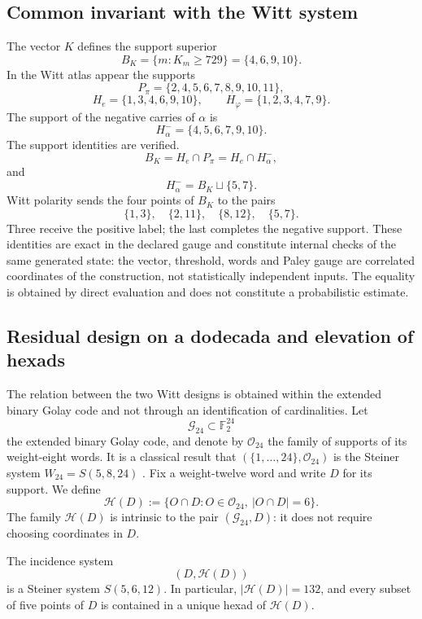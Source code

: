 \subsection{Common invariant with the Witt system}

The vector \(K\) defines the support superior
\[
B_K=\{m:K_m\ge729\}=\{4,6,9,10\}.
\]
In the Witt atlas appear the supports
\[
P_\pi=\{2,4,5,6,7,8,9,10,11\},
\]
\[
H_e=\{1,3,4,6,9,10\},
\qquad
H_\varphi=\{1,2,3,4,7,9\}.
\]
The support of the negative carries of \(\alpha\) is
\[
H_\alpha^-=\{4,5,6,7,9,10\}.
\]
The support identities are verified.
\[
\boxed{
B_K=H_e\cap P_\pi=H_e\cap H_\alpha^-,}
\]
and
\[
\boxed{H_\alpha^-=B_K\sqcup\{5,7\}.}
\]
Witt polarity sends the four points of \(B_K\) to the pairs
\[
\{1,3\},\quad\{2,11\},\quad\{8,12\},\quad\{5,7\}.
\]
Three receive the positive label; the last completes the negative support.
These identities are exact in the declared gauge and constitute internal
checks of the same generated state: the vector, threshold, words and
Paley gauge are correlated coordinates of the construction, not
statistically independent inputs. The equality is obtained by
direct evaluation and does not constitute a probabilistic estimate.

\subsection{Residual design on a dodecada and elevation of hexads}
\label{p12-83-c17-s1:sec:w12-w24-elevacion}

The relation between the two Witt designs is obtained within the extended
binary Golay code and not through an identification of cardinalities.
Let
\[
\mathcal G_{24}\subset\mathbb F_2^{24}
\]
the extended binary Golay code, and denote by \(\mathcal O_{24}\) the family
of supports of its weight-eight words. It is a classical result that
\((\{1,\ldots,24\},\mathcal O_{24})\) is the Steiner system
\(W_{24}=S(5,8,24)\) \cite{MacWilliamsSloane1977,ConwaySloane1999}.
Fix a weight-twelve word and write \(D\) for its support. We define
\begin{equation}
 \mathcal H(D)
 :=\{O\cap D:O\in\mathcal O_{24},\ |O\cap D|=6\}.
 \label{p12-83-c17-s1:eq:hexadas-residuales-dodecada}
\end{equation}
The family \(\mathcal H(D)\) is intrinsic to the pair
\((\mathcal G_{24},D)\): it does not require choosing coordinates in \(D\).

\begin{theorem}
\label{p12-83-c17-s1:thm:dodecada-w12}
The incidence system
\[
 (D,\mathcal H(D))
\]
is a Steiner system \(S(5,6,12)\). In particular,
\(|\mathcal H(D)|=132\), and every subset of five points of \(D\) is
contained in a unique hexad of \(\mathcal H(D)\).
\end{theorem}

